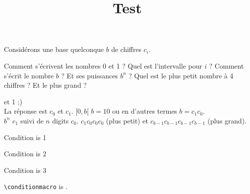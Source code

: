 \documentclass{exercice}
\title{Test}
\author{}
\begin{document}
\maketitle

\begin{Exercise}[title={Système positionnel}]
  Considérons une base quelconque $b$ de chiffres $c_i$.

\Question 
Comment s'écrivent les nombres 0 et 1 ?
\Question
Quel est l’intervalle pour $i$ ?
\Question
Comment s'écrit le nombre $b$ ? Et ses puissances $b^n$ ?
\Question
Quel est le plus petit nombre à 4 chiffres ? Et le plus grand ?
\end{Exercise}

\begin{Answer}
   et 1 ;)  
  \\
  La réponse est $c_0$ et $c_1$.
  \Question
  $[0, b[$
  \Question
  $b=10$ ou en d'autres termes $b=c_1c_0$.
  \\
  $b^n$ $c_1$ suivi de $n$ digits $c_0$. 
  \Question
  $c_1c_0c_0c_0$ (plus petit) et   $c_{b-1}c_{b-1}c_{b-1}c_{b-1}$ (plus grand).
\end{Answer}


\ifnum{} Condition is 1\fi 

\ifnum{} Condition is 2\fi

\ifnum{} Condition is 3\fi

\verb|\conditionmacro| is \texttt{\meaning\conditionmacro}.
\end{document}
